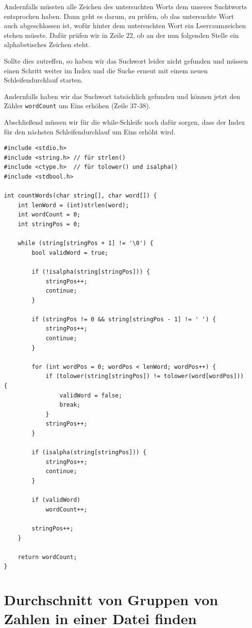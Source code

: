 Andernfalls müssten alle Zeichen des untersuchten Worts dem unseres Suchtworts
entsprochen haben. Dann geht es darum, zu prüfen, ob das untersuchte Wort auch
abgeschlossen ist, wofür hinter dem untersuchten Wort ein Leerraumzeichen stehen
müsste. Dafür prüfen wir in Zeile 22, ob an der nun folgenden Stelle ein
alphabetisches Zeichen steht.

Sollte dies zutreffen, so haben wir das Suchwort leider nicht gefunden und
müssen einen Schritt weiter im Index und die Suche erneut mit einem neuen
Schleifendurchlauf starten.

Andernfalls haben wir das Suchwort tatsächlich gefunden und können jetzt den
Zähler \texttt{wordCount} um Eins erhöhen (Zeile 37-38).

Abschließend müssen wir für die while-Schleife noch dafür sorgen, dass der Index
für den nächsten Schleifendurchlauf um Eins erhöht wird.

\begin{verbatim}
#include <stdio.h>
#include <string.h> // für strlen()
#include <ctype.h>  // für tolower() und isalpha()
#include <stdbool.h>

int countWords(char string[], char word[]) {
    int lenWord = (int)strlen(word);
    int wordCount = 0;
    int stringPos = 0;

    while (string[stringPos + 1] != '\0') {
        bool validWord = true;

        if (!isalpha(string[stringPos])) {
            stringPos++;
            continue;
        }

        if (stringPos != 0 && string[stringPos - 1] != ' ') {
            stringPos++;
            continue;
        }

        for (int wordPos = 0; wordPos < lenWord; wordPos++) {
            if (tolower(string[stringPos]) != tolower(word[wordPos])) {
                validWord = false;
                break;
            }
            stringPos++;
        }

        if (isalpha(string[stringPos])) {
            stringPos++;
            continue;
        }

        if (validWord)
            wordCount++;

        stringPos++;
    }

    return wordCount;
}
\end{verbatim}






\chapter{Durchschnitt von Gruppen von Zahlen in einer Datei finden}

